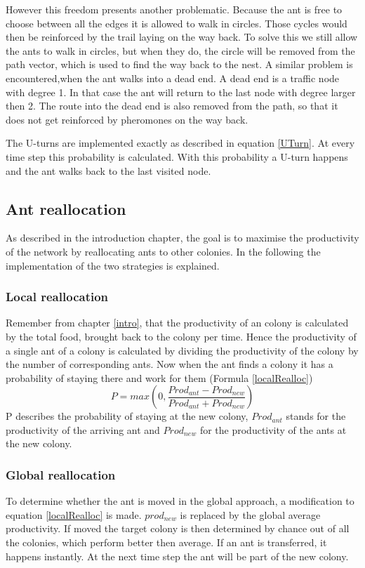 However this freedom presents another problematic. Because the ant is free to choose between all the edges it is allowed to walk in circles. Those cycles would then be reinforced by the trail laying on the way back. To solve this we still allow the ants to walk in circles, but when they do, the circle will be removed from the path vector, which is used to find the way back to the nest. A similar problem is encountered,when the ant walks into a dead end. A dead end is a traffic node with degree 1. In that case the ant will return to the last node with degree larger then 2. The route into the dead end is also removed from the path, so that it does not get reinforced by pheromones on the way back.

The U-turns are implemented exactly as described in equation \ref{UTurn}. At every time step this probability is calculated. With this probability a U-turn happens and the ant walks back to the last visited node. 
\subsection{Ant reallocation}
As described in the introduction chapter, the goal is to maximise the productivity of the network by reallocating ants to other colonies. In the following the implementation of the two strategies is explained.
\subsubsection{Local reallocation}
Remember from chapter \ref{intro}, that the productivity of an colony is calculated by the total food, brought back to the colony per time. Hence the productivity of a single ant of a colony is calculated by dividing the productivity of the colony by the number of corresponding ants. Now when the ant finds a colony it has a probability of staying there and work for them (Formula \ref{localRealloc})
\begin{equation} \label{localRealloc}
P = max(0,\frac{Prod_{ant}-Prod_{new}}{Prod_{ant}+Prod_{new}})
\end{equation}
P describes the probability of staying at the new colony, $Prod_{ant}$ stands for the productivity of the arriving ant and $Prod_{new}$ for the productivity of the ants at the new colony.
\subsubsection{Global reallocation}
To determine whether the ant is moved in the global approach, a modification to equation \ref{localRealloc} is made. $prod_{new}$ is replaced by the global average productivity. If moved the target colony is then determined by chance out of all the colonies, which perform better then average.
If an ant is transferred, it happens instantly. At the next time step the ant will be part of the new colony.
